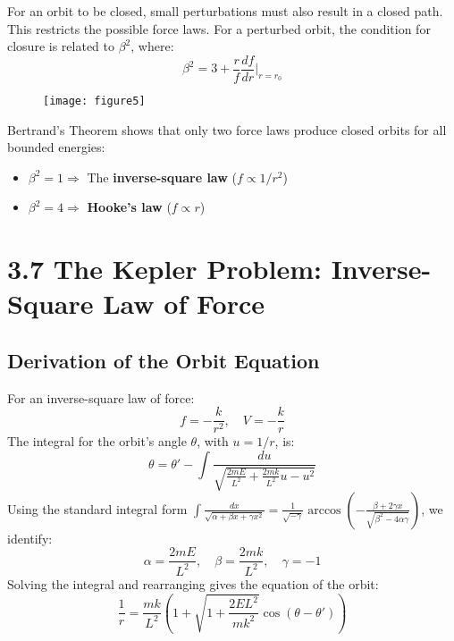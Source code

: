 \documentclass{article}
\begin{document}
	\bigskip
	
	For an orbit to be closed, small perturbations must also result in a closed path. This restricts the possible force laws. For a perturbed orbit, the condition for closure is related to \(\beta^2\), where:
	\[
	\beta^2 = 3 + \frac{r}{f} \frac{df}{dr}\bigg|_{r=r_0}
	\]
	
	\begin{figure}[h]
		\centering
		\texttt{[image: figure5]}
		\caption{}
		\label{fig:figure5}
	\end{figure}
	
	Bertrand's Theorem shows that only two force laws produce closed orbits for all bounded energies:
	\begin{itemize}
		\item \(\beta^2 = 1 \Rightarrow\) The \textbf{inverse-square law} (\(f \propto 1/r^2\))
		\item \(\beta^2 = 4 \Rightarrow\) \textbf{Hooke's law} (\(f \propto r\))
	\end{itemize}
	
	\hrulefill
	
	\section*{3.7 The Kepler Problem: Inverse-Square Law of Force}
	
	\subsection*{Derivation of the Orbit Equation}
	
	For an inverse-square law of force:
	\[
	f = -\frac{k}{r^2}, \quad V = -\frac{k}{r}
	\]
	The integral for the orbit's angle \(\theta\), with \(u=1/r\), is:
	\[
	\theta = \theta' - \int \frac{du}{\sqrt{\frac{2mE}{L^2} + \frac{2mk}{L^2}u - u^2}}
	\]
	Using the standard integral form \(\int \frac{dx}{\sqrt{\alpha + \beta x + \gamma x^2}} = \frac{1}{\sqrt{-\gamma}} \arccos\left(-\frac{\beta + 2\gamma x}{\sqrt{\beta^2-4\alpha\gamma}}\right)\), we identify:
	\[
	\alpha = \frac{2mE}{L^2}, \quad \beta = \frac{2mk}{L^2}, \quad \gamma = -1
	\]
	Solving the integral and rearranging gives the equation of the orbit:
	\[
	\frac{1}{r} = \frac{mk}{L^2} \left(1 + \sqrt{1 + \frac{2EL^2}{mk^2}} \cos(\theta - \theta')\right)
	\]
	
\end{document}
